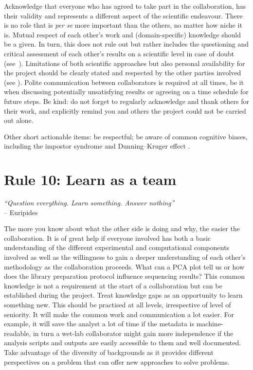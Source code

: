 \documentclass{article}
\begin{document}
Acknowledge that everyone who has agreed to take part in the collaboration, has their validity and represents a different aspect of the scientific endeavour. There is no role that is \textit{per se} more important than the others, no matter how niche it is. Mutual respect of each other’s work and (domain-specific) knowledge should be a given. In turn, this does not rule out but rather includes the questioning and critical assessment of each other's results on a scientific level in case of doubt (see~). Limitations of both scientific approaches but also personal availability for the project should be clearly stated and respected by the other parties involved (see ). Polite communication between collaborators is required at all times, be it when discussing potentially unsatisfying results or agreeing on a time schedule for future steps. Be kind: do not forget to regularly acknowledge and thank others for their work, and explicitly remind you and others the project could not be carried out alone.

Other short actionable items: be respectful; be aware of common cognitive biases, including the impostor syndrome \cite{clance1978imposter} and Dunning–Kruger effect \cite{kruger1999unskilled}.

\section*{Rule 10: Learn as a team} %
\label{rule10_learn}

\begin{flushright}
\rightskip=1cm\textit{``Question everything. Learn something. Answer nothing''} \\
\vspace{.2em}
\rightskip=0cm -- Euripides 
\end{flushright}

The more you know about what the other side is doing and why, the easier the collaboration. It is of great help if everyone involved has both a basic understanding of the different experimental and computational components involved as well as the willingness to gain a deeper understanding of each other's methodology as the collaboration proceeds. What can a PCA plot tell us or how does the library preparation protocol influence sequencing results? This common knowledge is not a requirement at the start of a collaboration but can be established during the project. Treat knowledge gaps as an opportunity to learn something new. This should be practised at all levels, irrespective of level of seniority. It will make the common work and communication a lot easier. For example, it will save the analyst a lot of time if the metadata is machine-readable, in turn a wet-lab collaborator might gain more independence if the analysis scripts and outputs are easily accessible to them and well documented. Take advantage of the diversity of backgrounds as it provides different perspectives on a problem that can offer new approaches to solve problems.
\end{document}
